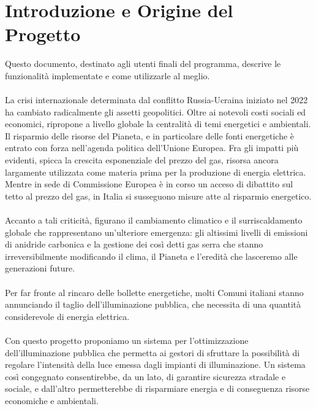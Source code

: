 \documentclass[a4paper, 12pt]{article}
\begin{document}
\makeindexdetails
\makefrontpage \makeversioni
\tableofcontents
\newpage
\clearpage
{}
\newpage
\listoffigures
\newpage
\section{Introduzione e Origine del Progetto}
Questo documento, destinato agli utenti finali del programma, descrive le funzionalità implementate e come utilizzarle al meglio.\\ \\
La crisi internazionale determinata dal conflitto Russia-Ucraina iniziato nel 2022 ha cambiato radicalmente gli assetti geopolitici. Oltre ai notevoli costi sociali ed economici, ripropone a livello globale la centralità di temi energetici e ambientali.\\
Il risparmio delle risorse del Pianeta, e in particolare delle fonti energetiche è entrato con forza nell'agenda politica dell'Unione Europea. Fra gli impatti più evidenti, spicca la crescita esponenziale del prezzo del gas, risorsa ancora largamente utilizzata come materia prima per la produzione di energia elettrica. Mentre in sede di Commissione Europea è in corso un acceso di dibattito sul tetto al prezzo del gas, in Italia si susseguono misure atte al risparmio energetico.\\\\
Accanto a tali criticità, figurano il cambiamento climatico e il surriscaldamento globale che rappresentano un'ulteriore emergenza: gli altissimi livelli di emissioni di anidride carbonica e la gestione dei così detti gas serra che stanno irreversibilmente modificando il clima, il Pianeta e l'eredità che lasceremo alle generazioni future.\\\\
Per far fronte al rincaro delle bollette energetiche, molti Comuni italiani stanno annunciando il taglio dell'illuminazione pubblica, che necessita di una quantità considerevole di energia elettrica.\\\\
Con questo progetto proponiamo un sistema per l'ottimizzazione dell'illuminazione pubblica che permetta ai gestori di sfruttare la possibilità di regolare l'intensità della luce emessa dagli impianti di illuminazione. Un sistema così congegnato consentirebbe, da un lato, di garantire sicurezza stradale e sociale, e dall'altro permetterebbe di risparmiare energia e di conseguenza risorse economiche e ambientali.
\end{document}
